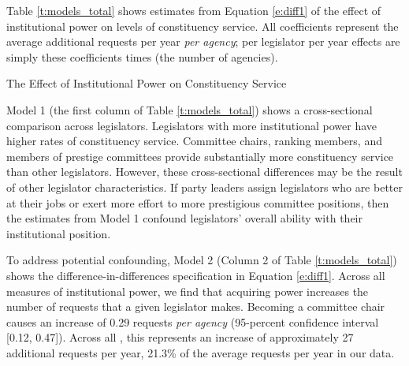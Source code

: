 \documentclass[12pt]{article}
\begin{document}
Table \ref{t:models_total} shows estimates from Equation \ref{e:diff1} of the effect of institutional power on levels of constituency service. All coefficients represent the average additional requests per year \textit{per agency}; per legislator per year effects are simply these coefficients times  (the number of agencies).


\begin{table}[hbt!]
\caption{The Effect of Institutional Power on Constituency Service} \label{t:models_total}
\begin{minipage}{\textwidth}
\begin{center}
\end{center}
\end{minipage}
\end{table}

Model 1 (the first column of Table \ref{t:models_total}) shows a cross-sectional comparison across legislators. Legislators with more institutional power have higher rates of constituency service. %
Committee chairs, ranking members, and members of prestige committees %
provide substantially more constituency service than other legislators. However, these cross-sectional differences may be the result of other legislator characteristics. If party leaders assign legislators who are better at their jobs or exert more effort to more prestigious committee positions, then the estimates from Model 1 confound legislators' overall ability with their institutional position.   

To address potential confounding, Model 2 (Column 2 of Table \ref{t:models_total}) shows the difference-in-differences specification in Equation \ref{e:diff1}. Across all measures of institutional power, we find that acquiring power increases the number of requests that a given legislator makes. Becoming a committee chair causes an increase of  0.29 requests \textit{per agency} (95-percent confidence interval [0.12, 0.47]). Across all , this represents an increase of approximately 27 additional requests per year, 21.3\% of the average requests per year in our data. %
\end{document}
